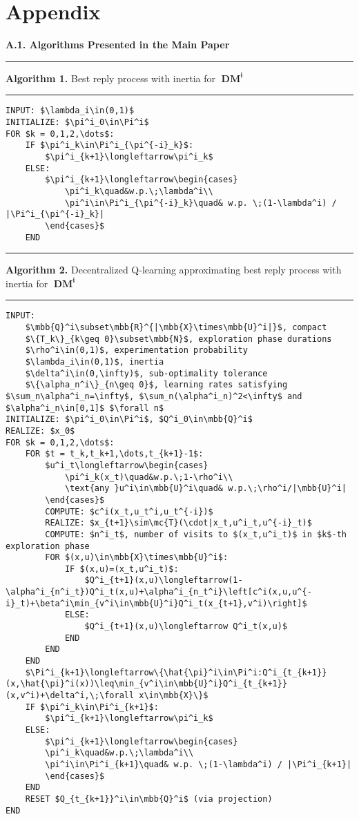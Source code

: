 \documentclass[10pt]{article}
\newcommand{\mbb}[1]{\mathbb{#1}}
\newcommand{\1}[1]{\mathbbm{1}_{#1}}
\newcommand{\mc}[1]{\mathcal{#1}}
\DeclareMathOperator{\DM}{DM}
\begin{document}
\newpage
{}
\section*{Appendix}
{\bf A.1. Algorithms Presented in the Main Paper}\\[5pt]
\hrule
{\bf Algorithm 1.} Best reply process with inertia for $\mathbf{\DM^i}$
\hrule
\begin{lstlisting}[mathescape]
INPUT: $\lambda_i\in(0,1)$
INITIALIZE: $\pi^i_0\in\Pi^i$
FOR $k = 0,1,2,\dots$:
    IF $\pi^i_k\in\Pi^i_{\pi^{-i}_k}$:
        $\pi^i_{k+1}\longleftarrow\pi^i_k$
    ELSE:
        $\pi^i_{k+1}\longleftarrow\begin{cases}
            \pi^i_k\quad&w.p.\;\lambda^i\\
            \pi^i\in\Pi^i_{\pi^{-i}_k}\quad& w.p. \;(1-\lambda^i) / |\Pi^i_{\pi^{-i}_k}|
        \end{cases}$
    END
\end{lstlisting}
\hrule
{\bf Algorithm 2.} Decentralized Q-learning approximating best reply process with inertia for $\mathbf{\DM^i}$
\hrule
\begin{lstlisting}[mathescape]
INPUT:
    $\mbb{Q}^i\subset\mbb{R}^{|\mbb{X}\times\mbb{U}^i|}$, compact
    $\{T_k\}_{k\geq 0}\subset\mbb{N}$, exploration phase durations
    $\rho^i\in(0,1)$, experimentation probability
    $\lambda_i\in(0,1)$, inertia
    $\delta^i\in(0,\infty)$, sub-optimality tolerance
    $\{\alpha_n^i\}_{n\geq 0}$, learning rates satisfying $\sum_n\alpha^i_n=\infty$, $\sum_n(\alpha^i_n)^2<\infty$ and $\alpha^i_n\in[0,1]$ $\forall n$
INITIALIZE: $\pi^i_0\in\Pi^i$, $Q^i_0\in\mbb{Q}^i$
REALIZE: $x_0$
FOR $k = 0,1,2,\dots$:
    FOR $t = t_k,t_k+1,\dots,t_{k+1}-1$:
        $u^i_t\longleftarrow\begin{cases}
            \pi^i_k(x_t)\quad&w.p.\;1-\rho^i\\
            \text{any }u^i\in\mbb{U}^i\quad& w.p.\;\rho^i/|\mbb{U}^i|
        \end{cases}$
        COMPUTE: $c^i(x_t,u_t^i,u_t^{-i})$
        REALIZE: $x_{t+1}\sim\mc{T}(\cdot|x_t,u^i_t,u^{-i}_t)$
        COMPUTE: $n^i_t$, number of visits to $(x_t,u^i_t)$ in $k$-th exploration phase 
        FOR $(x,u)\in\mbb{X}\times\mbb{U}^i$:
            IF $(x,u)=(x_t,u^i_t)$:
                $Q^i_{t+1}(x,u)\longleftarrow(1-\alpha^i_{n^i_t})Q^i_t(x,u)+\alpha^i_{n_t^i}\left[c^i(x,u,u^{-i}_t)+\beta^i\min_{v^i\in\mbb{U}^i}Q^i_t(x_{t+1},v^i)\right]$
            ELSE:
                $Q^i_{t+1}(x,u)\longleftarrow Q^i_t(x,u)$
            END
        END
    END
    $\Pi^i_{k+1}\longleftarrow\{\hat{\pi}^i\in\Pi^i:Q^i_{t_{k+1}}(x,\hat{\pi}^i(x))\leq\min_{v^i\in\mbb{U}^i}Q^i_{t_{k+1}}(x,v^i)+\delta^i,\;\forall x\in\mbb{X}\}$
    IF $\pi^i_k\in\Pi^i_{k+1}$:
        $\pi^i_{k+1}\longleftarrow\pi^i_k$
    ELSE:
        $\pi^i_{k+1}\longleftarrow\begin{cases}
        \pi^i_k\quad&w.p.\;\lambda^i\\
        \pi^i\in\Pi^i_{k+1}\quad& w.p. \;(1-\lambda^i) / |\Pi^i_{k+1}|
        \end{cases}$
    END
    RESET $Q_{t_{k+1}}^i\in\mbb{Q}^i$ (via projection)
END
\end{lstlisting}
\end{document}
